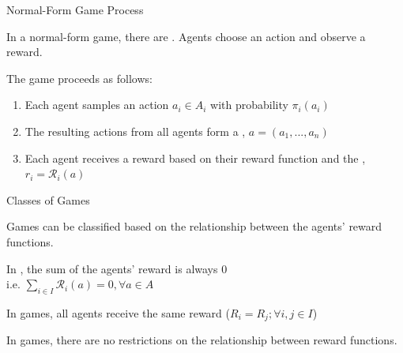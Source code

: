 \begin{frame}{Normal-Form Game Process}

    In a normal-form game, there are . Agents choose an action and observe a reward.
    \vspace{10pt}
    \pause
    
    The game proceeds as follows:
    \pause
    
    \begin{enumerate}
        \item<2-> Each agent samples an action \(a_i \in A_i\) with probability \(\pi_i(a_i)\)
        \pause
        \item<3-> The resulting actions from all agents form a , \(a = (a_1, ... , a_n)\)
        \pause
        \item<4-> Each agent receives a reward based on their  reward function and the , \(r_i = \mathcal{R}_i(a)\)
    \end{enumerate}
    
\end{frame}

\begin{frame}{Classes of Games}

    Games can be classified based on the relationship between the agents' reward functions. 

    \blist
        \item In , the sum of the agents' reward is always 0\\
        i.e. \(\sum_{i \in I} \mathcal{R}_{i} (a) = 0, \forall a \in A\)
        \item In  games, all agents receive the same reward 
        (\(R_i = R_j ; \forall i, j \in I\))
        \item In  games, there are no restrictions on the relationship between reward functions. 
    \elist
    
\end{frame}

